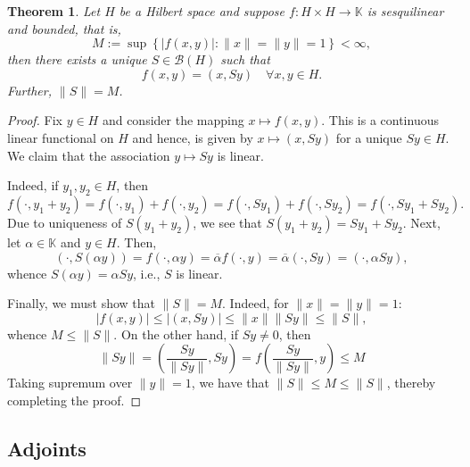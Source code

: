 \documentclass[11pt]{article}
\theoremstyle{thmstyle}
\newtheorem{theorem}{Theorem}[section]
\theoremstyle{defstyle}
\newcommand{\R}{\mathbb{R}}
\newcommand{\bbC}{\mathbb{C}}
\newcommand{\K}{\mathbb{K}} %
\newcommand{\scrB}{\mathscr B}
\renewcommand{\le}{\leqslant}
\begin{document}
\begin{theorem}
    Let $H$ be a Hilbert space and suppose $f: H\times H\to\K$ is sesquilinear and bounded, that is, 
    \begin{equation*}
        M := \sup\left\{|f(x, y)|\colon \|x\| = \|y\| = 1\right\} < \infty,
    \end{equation*}
    then there exists a unique $S\in\scrB(H)$ such that 
    \begin{equation*}
        f(x, y) = (x, Sy)\quad\forall x,y\in H.
    \end{equation*}
    Further, $\|S\| = M$.
\end{theorem}
\begin{proof}
    Fix $y\in H$ and consider the mapping $x\mapsto f(x, y)$. This is a continuous linear functional on $H$ and hence, is given by $x\mapsto (x, Sy)$ for a unique $Sy\in H$. We claim that the association $y\mapsto Sy$ is linear.

    Indeed, if $y_1, y_2\in H$, then 
    \begin{equation*}
        f(\cdot, y_1 + y_2) = f(\cdot, y_1) + f(\cdot, y_2) = f(\cdot, Sy_1) + f(\cdot, Sy_2) = f\left(\cdot, Sy_1 + Sy_2\right).
    \end{equation*}
    Due to uniqueness of $S(y_1 + y_2)$, we see that $S(y_1 + y_2) = Sy_1 + Sy_2$. Next, let $\alpha\in\K$ and $y\in H$. Then, 
    \begin{equation*}
        (\cdot, S(\alpha y)) = f(\cdot, \alpha y) = \overline\alpha f(\cdot, y) = \overline\alpha (\cdot, Sy) = (\cdot, \alpha Sy),
    \end{equation*}
    whence $S(\alpha y) = \alpha Sy$, i.e., $S$ is linear.

    Finally, we must show that $\|S\| = M$. Indeed, for $\|x\| = \|y\| = 1$:
    \begin{equation*}
        |f(x, y)|\le |(x, Sy)|\le \|x\|\|Sy\|\le\|S\|,
    \end{equation*}
    whence $M\le \|S\|$. On the other hand, if $Sy\ne 0$, then 
    \begin{equation*}
        \|Sy\| = \left(\frac{Sy}{\|Sy\|}, Sy\right) = f\left(\frac{Sy}{\|Sy\|}, y\right)\le M
    \end{equation*}
    Taking supremum over $\|y\| = 1$, we have that $\|S\|\le M\le \|S\|$, thereby completing the proof.
\end{proof}

\subsection{Adjoints}
\end{document}
